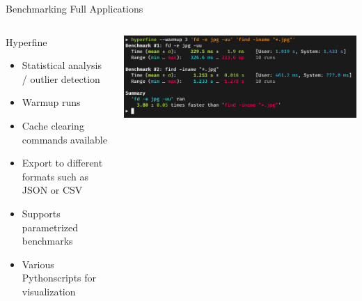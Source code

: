 \documentclass[compress,aspectratio=169]{beamer}
\begin{document}
\begin{frame}{Benchmarking Full Applications}
  \begin{columns}
    \begin{column}{0.5\textwidth}
      \begin{block}{Hyperfine \cite{hyperfine}}
        \begin{itemize}
          \item Statistical analysis / outlier detection
          \item Warmup runs
          \item Cache clearing commands available
          \item Export to different formats such as JSON or CSV
          \item Supports parametrized benchmarks
          \item Various Pythonscripts for visualization
        \end{itemize}
      \end{block}
    \end{column}
    \begin{column}{0.5\textwidth}
      \includegraphics[width=\textwidth]{../assets/hyperfine.png} \cite{hyperfine}
    \end{column}
  \end{columns}
\end{frame}
\end{document}
